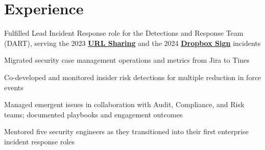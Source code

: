 \documentclass[letterpaper]{deedy-resume} %
\begin{document}
\begin{minipage}[t]{0.66\textwidth} %


\section{Experience}


\vspace{\topsep} %
\begin{tightitemize}
\item Fulfilled Lead Incident Response role for the Detections and Response Team (DART), serving the 2023 \textbf{\href{https://dropbox.tech/security/changing-how-we-identify-malicious-urls-in-shared-documents}{URL Sharing}} and the 2024 \textbf{\href{https://sign.dropbox.com/blog/a-recent-security-incident-involving-dropbox-sign}{Dropbox Sign}} incidents \\
\item Migrated security case management operations and metrics from Jira to Tines \\
\item Co-developed and monitored insider risk detections for multiple reduction in force events \\
\item Managed emergent issues in collaboration with Audit, Compliance, and Risk teams; documented playbooks and engagement outcomes \\
\item Mentored five security engineers as they transitioned into their first enterprise incident response roles \\
\end{tightitemize}

\sectionspace %




\end{minipage}
\end{document}
